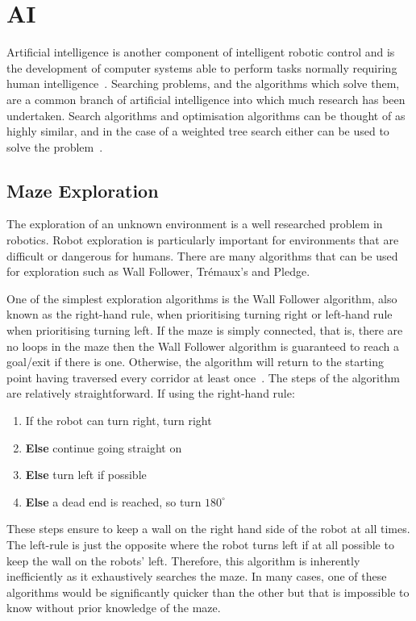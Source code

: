 \section{AI}\label{litreview/maze}
Artificial intelligence is another component of intelligent robotic control and is the development of computer systems able to perform tasks normally requiring human intelligence~\cite{russell2016artificial}. Searching problems, and the algorithms which solve them, are a common branch of artificial intelligence into which much research has been undertaken. Search algorithms and optimisation algorithms can be thought of as highly similar, and in the case of a weighted tree search either can be used to solve the problem~\cite{kanal2012search}. 
\subsection{Maze Exploration}\label{litreview/maze/exploration}
The exploration of an unknown environment is a well researched problem in 
robotics. Robot exploration is particularly important for 
environments that are difficult or dangerous for humans. There are many
algorithms that can be used for exploration such as Wall Follower, 
Trémaux's and Pledge.

One of the simplest exploration algorithms is the Wall Follower algorithm, 
also known as the right-hand rule, when prioritising turning right or 
left-hand rule when prioritising turning left. If the maze is simply 
connected, that is, there are no loops in the maze then the Wall Follower 
algorithm is guaranteed to reach a goal/exit if there is one. Otherwise, the 
algorithm will return to the starting point having traversed every corridor at 
least once~\cite{wallFollowerArcBotics}. The steps of the algorithm are 
relatively straightforward. If using the right-hand rule:
\begin{enumerate}
\item If the robot can turn right, turn right
\item \textbf{Else} continue going straight on
\item \textbf{Else} turn left if possible
\item \textbf{Else} a dead end is reached, so turn $180^{\circ}$
\end{enumerate}
These steps ensure to keep a wall on the right hand side of the robot at 
all times. The left-rule is just the opposite where the robot turns left 
if at all possible to keep the wall on the robots' left. Therefore,
this algorithm is inherently inefficiently as it exhaustively searches the
maze. In many cases, one of these algorithms would be significantly quicker
than the other but that is impossible to know without prior knowledge of 
the maze.

